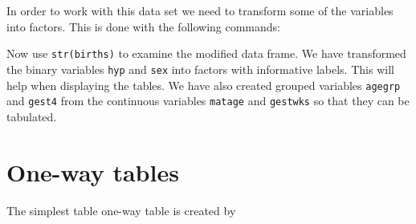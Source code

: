 \documentclass[
]{book}
\newenvironment{Shaded}{\begin{snugshade}}{\end{snugshade}}
\newcommand{\AttributeTok}[1]{\textcolor[rgb]{0.13,0.29,0.53}{#1}}
\newcommand{\ConstantTok}[1]{\textcolor[rgb]{0.56,0.35,0.01}{#1}}
\newcommand{\DecValTok}[1]{\textcolor[rgb]{0.00,0.00,0.81}{#1}}
\newcommand{\FunctionTok}[1]{\textcolor[rgb]{0.13,0.29,0.53}{\textbf{#1}}}
\newcommand{\NormalTok}[1]{#1}
\newcommand{\OtherTok}[1]{\textcolor[rgb]{0.56,0.35,0.01}{#1}}
\newcommand{\SpecialCharTok}[1]{\textcolor[rgb]{0.81,0.36,0.00}{\textbf{#1}}}
\newcommand{\StringTok}[1]{\textcolor[rgb]{0.31,0.60,0.02}{#1}}
\begin{document}
In order to work with this data set we need to transform some of the variables
into factors. This is done with the following commands:

\begin{Shaded}
\end{Shaded}

Now use \texttt{str(births)} to examine the modified data frame. We have
transformed the binary variables \texttt{hyp} and \texttt{sex} into factors
with informative labels. This will help when displaying the tables. We
have also created grouped variables \texttt{agegrp} and \texttt{gest4} from
the continuous variables \texttt{matage} and \texttt{gestwks} so that they
can be tabulated.

\section{One-way tables}\label{one-way-tables}

The simplest table one-way table is created by
\end{document}

